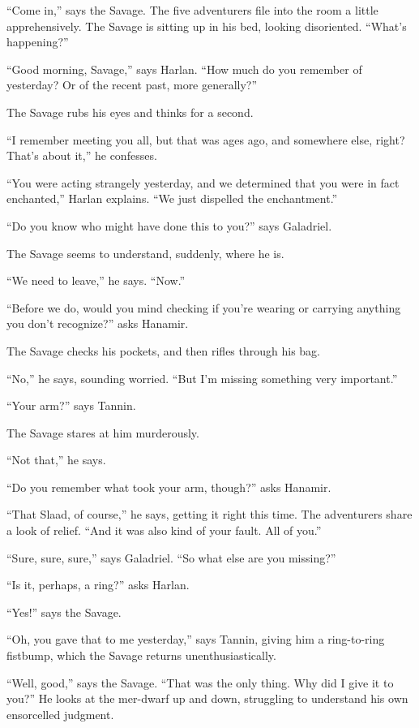 \documentclass[smalldemyvopaper,11pt,twoside,onecolumn,openright,extrafontsizes]{memoir}
\begin{document}
``Come in,'' says the Savage. The five adventurers file into the room a
little apprehensively. The Savage is sitting up in his bed, looking
disoriented. ``What's happening?''

``Good morning, Savage,'' says Harlan. ``How much do you remember of
yesterday? Or of the recent past, more generally?''

The Savage rubs his eyes and thinks for a second.

``I remember meeting you all, but that was ages ago, and somewhere else,
right? That's about it,'' he confesses.

``You were acting strangely yesterday, and we determined that you were
in fact enchanted,'' Harlan explains. ``We just dispelled the
enchantment.''

``Do you know who might have done this to you?'' says Galadriel.

The Savage seems to understand, suddenly, where he is.

``We need to leave,'' he says. ``Now.''

``Before we do, would you mind checking if you're wearing or carrying
anything you don't recognize?'' asks Hanamir.

The Savage checks his pockets, and then rifles through his bag.

``No,'' he says, sounding worried. ``But I'm missing something very
important.''

``Your arm?'' says Tannin.

The Savage stares at him murderously.

``Not that,'' he says.

``Do you remember what took your arm, though?'' asks Hanamir.

``That Slaad, of course,'' he says, getting it right this time. The
adventurers share a look of relief. ``And it was also kind of your
fault. All of you.''

``Sure, sure, sure,'' says Galadriel. ``So what else are you missing?''

``Is it, perhaps, a ring?'' asks Harlan.

``Yes!'' says the Savage.

``Oh, you gave that to me yesterday,'' says Tannin, giving him a
ring-to-ring fistbump, which the Savage returns unenthusiastically.

``Well, good,'' says the Savage. ``That was the only thing. Why did I
give it to you?'' He looks at the mer-dwarf up and down, struggling to
understand his own ensorcelled judgment.
\end{document}
